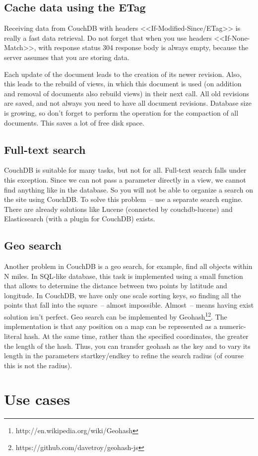 \subsection{Cache data using the ETag}

Receiving data from CouchDB with headers <<If-Modified-Since/ETag>> is really a fast data retrieval. Do not forget that when you use headers <<If-None-Match>>, with response status 304 response body is always empty, because the server assumes that you are storing data.

Each update of the document leads to the creation of its newer revision. Also, this leads to the rebuild of views, in which this document is used (on addition and removal of documents also rebuild views) in their next call. All old revisions are saved, and not always you need to have all document revisions. Database size is growing, so don't forget to perform the operation for the compaction of all documents. This saves a lot of free disk space.

\subsection{Full-text search}

CouchDB is suitable for many tasks, but not for all. Full-text search falls under this exception. Since we can not pass a parameter directly in a view, we cannot find anything like in the database. So you will not be able to organize a search on the site using CouchDB. To solve this problem~-- use a separate search engine. There are already solutions like Lucene (connected by couchdb-lucene) and Elasticsearch (with a plugin for CouchDB) exists.

\subsection{Geo search}

Another problem in CouchDB is a geo search, for example, find all objects within N miles. In SQL-like database, this task is implemented using a small function that allows to determine the distance between two points by latitude and longitude. In CouchDB, we have only one scale sorting keys, so finding all the points that fall into the square~-- almost impossible. Almost~-- means having exist solution isn’t perfect. Geo search can be implemented by Geohash\footnote{http://en.wikipedia.org/wiki/Geohash}\footnote{https://github.com/davetroy/geohash-js}. The implementation is that any position on a map can be represented as a numeric-literal hash. At the same time, rather than the specified coordinates, the greater the length of the hash. Thus, you can transfer geohash as the key and to vary its length in the parameters startkey/endkey to refine the search radius (of course this is not the radius).


\section{Use cases}